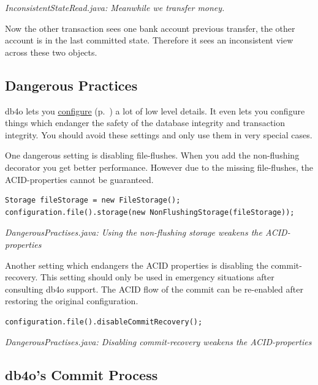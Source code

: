 {\small\itshape InconsistentStateRead.java: Meanwhile we transfer money.\par}
\medskip

Now the other transaction sees one bank account previous transfer, the other account is in the last committed state. Therefore it sees an inconsistent view across these two objects.

\subsection{Dangerous Practices}
\label{ref:basics-acid-and-transactions-dangerous-practises}

db4o lets you \hyperref[ref:configuration]{configure} (p.~\pageref{ref:configuration}) a lot of low level details. It even lets you configure things which endanger the safety of the database integrity and transaction integrity. You should avoid these settings and only use them in very special cases.

One dangerous setting is disabling file-flushes. When you add the non-flushing decorator you get better performance. However due to the missing file-flushes, the ACID-properties cannot be guaranteed.

\begin{lstlisting}
Storage fileStorage = new FileStorage();
configuration.file().storage(new NonFlushingStorage(fileStorage));
\end{lstlisting}

{\small\itshape DangerousPractises.java: Using the non-flushing storage weakens the ACID-properties\par}
\medskip

Another setting which endangers the ACID properties is disabling the commit-recovery. This setting should only be used in emergency situations after consulting db4o support. The ACID flow of the commit can be re-enabled after restoring the original configuration.

\begin{lstlisting}
configuration.file().disableCommitRecovery();
\end{lstlisting}

{\small\itshape DangerousPractises.java: Disabling commit-recovery weakens the ACID-properties\par}
\medskip

\subsection{db4o's Commit Process}
\label{ref:basics-acid-and-transactions-commit-process-db4o}


